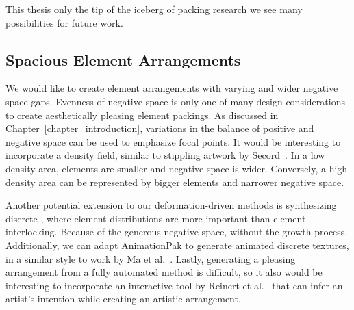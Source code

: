 \newtext
{
This thesis  only the tip of the iceberg of packing research 
we see many possibilities for future work.
}

\subsection{Spacious Element Arrangements}

We would like to create element arrangements with varying and wider negative space gaps.
Evenness of negative space is only one of many design considerations to create aesthetically pleasing element packings.
As discussed in Chapter~\ref{chapter_introduction}, variations in the balance of positive and negative space can be used to emphasize focal points.
It would be interesting to incorporate a density field, similar to stippling artwork by Secord~\cite{Secord2002}.
In a low density area, elements are smaller and negative space is wider. 
Conversely, a high density area can be represented by bigger elements and narrower negative space. 



Another potential extension to our deformation-driven methods is synthesizing discrete ,
where element distributions are more important than element interlocking.
Because of the generous negative space,  without the growth process.
Additionally, we can adapt AnimationPak to generate animated discrete textures, in a similar style to work by Ma et al.~\cite{Ma2013}. 
Lastly, generating a pleasing arrangement from a fully automated method is difficult, 
so it also would be interesting to incorporate an interactive tool by Reinert et al.~\cite{Reinert2013} 
that can infer an artist's intention while creating an artistic arrangement.



